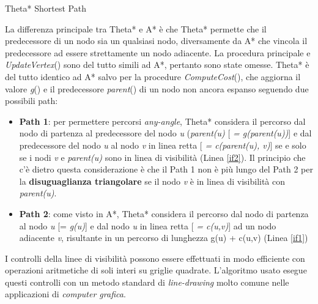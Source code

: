 \documentclass[11pt]{book}
\begin{document}
\begin{algorithm}
\PrintSemicolon
\caption{Theta* Shortest Path}
  \LinesNumbered
\setcounter{AlgoLine}{32}
\end{algorithm}

\par{
La differenza principale tra Theta* e  A* \`e che Theta* permette che il predecessore di un nodo sia un qualsiasi nodo, diversamente da A* che vincola il predecessore ad essere strettamente un nodo adiacente. La procedura principale e \emph{UpdateVertex}() sono del tutto simili ad A*, pertanto sono state omesse. Theta* \`e del tutto identico ad A* salvo per la procedure \emph{ComputeCost}(), che aggiorna il valore \emph{g}() e il predecessore \emph{parent}() di un nodo non ancora espanso seguendo due possibili path:
\begin{itemize}
\item \textbf{Path 1}: per permettere percorsi \emph{any-angle}, Theta* considera il percorso dal nodo di partenza al predecessore del nodo \emph{u} (\emph{parent(u)} [ \emph{= g(parent(u))}] e dal predecessore del nodo \emph{u} al nodo \emph{v} in linea retta [ \emph{= c(parent(u), v)}] se e solo se i nodi \emph{v} e \emph{parent(u)} sono in linea di visibilit\`a (Linea \ref{if2}). Il principio che c'\`e dietro questa considerazione \`e che il Path 1 non \`e pi\`u lungo del Path 2 per la \textbf{disuguaglianza triangolare} se il nodo \emph{v} \`e in linea di visibilit\`a con \emph{parent(u)}.
\item \textbf{Path 2}: come visto in A*, Theta* considera il percorso dal nodo di partenza al nodo \emph{u} [= \emph{g(u)}] e dal nodo \emph{u} in linea retta [ \emph{= c(u,v)}] ad un nodo adiacente \emph{v}, risultante in un percorso di lunghezza g(u) + c(u,v) (Linea \ref{if1})

\end{itemize}
}
\par{I controlli della linee di visibilit\`a possono essere effettuati in modo efficiente con operazioni aritmetiche di soli interi su griglie quadrate. L'algoritmo usato esegue questi controlli con un metodo standard di \emph{line-drawing} molto comune nelle applicazioni di \emph{computer grafica}.}
\iffalse
\end{document}
